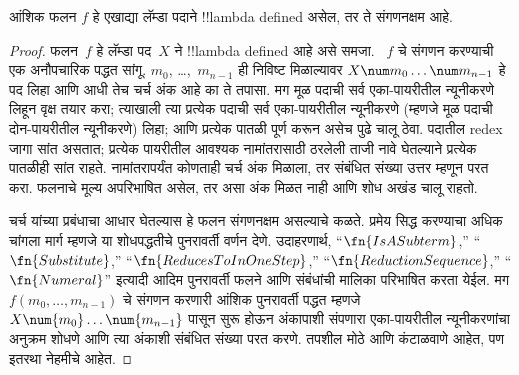 \documentclass[../../../include/open-logic-section]{subfiles}
\begin{document}

\begin{thm}
आंशिक फलन $f$ हे एखाद्या लॅम्डा पदाने !!{lambda defined}
असेल, तर ते संगणनक्षम आहे.
\end{thm}

\begin{proof}
फलन~$f$ हे लॅम्डा पद~$X$ ने !!{lambda defined} आहे असे समजा.
~$f$ चे संगणन करण्याची एक अनौपचारिक पद्धत सांगू.
$m_0$, \dots,~$m_{n-1}$ ही निविष्ट मिळाल्यावर
$X \num m_0 \ldots \num m_{n-1}$ हे पद लिहा आणि आधी तेच चर्च अंक आहे का ते तपासा.
मग मूळ पदाची सर्व एका-पायरीतील न्यूनीकरणे लिहून वृक्ष तयार करा;
त्याखाली त्या प्रत्येक पदाची सर्व एका-पायरीतील न्यूनीकरणे
(म्हणजे मूळ पदाची दोन-पायरीतील न्यूनीकरणे) लिहा; आणि
प्रत्येक पातळी पूर्ण करून असेच पुढे चालू ठेवा. पदातील redex
जागा सांत असतात; प्रत्येक पायरीतील आवश्यक नामांतरासाठी
ठरलेली ताजी नावे घेतल्याने प्रत्येक पातळीही सांत राहते.
नामांतरापर्यंत कोणताही चर्च अंक मिळाला, तर संबंधित संख्या
उत्तर म्हणून परत करा. फलनाचे मूल्य अपरिभाषित असेल, तर
असा अंक मिळत नाही आणि शोध अखंड चालू राहतो.

चर्च यांच्या प्रबंधाचा आधार घेतल्यास हे फलन संगणनक्षम
असल्याचे कळते. प्रमेय सिद्ध करण्याचा अधिक चांगला मार्ग
म्हणजे या शोधपद्धतीचे पुनरावर्ती वर्णन देणे. उदाहरणार्थ,
“$\fn{IsASubterm}$,” “$\fn{Substitute}$,”
“$\fn{ReducesToInOneStep}$,” “$\fn{ReductionSequence}$,”
“$\fn{Numeral}$” इत्यादी आदिम पुनरावर्ती फलने आणि
संबंधांची मालिका परिभाषित करता येईल. मग
$f(m_0, \dots, m_{n-1})$ चे संगणन करणारी आंशिक
पुनरावर्ती पद्धत म्हणजे $X \num{m_0} \dots \num{m_{n-1}}$
पासून सुरू होऊन अंकापाशी संपणारा एका-पायरीतील
न्यूनीकरणांचा अनुक्रम शोधणे आणि त्या अंकाशी संबंधित
संख्या परत करणे. तपशील मोठे आणि कंटाळवाणे आहेत,
पण इतरथा नेहमीचे आहेत.
\end{proof}
\end{document}
